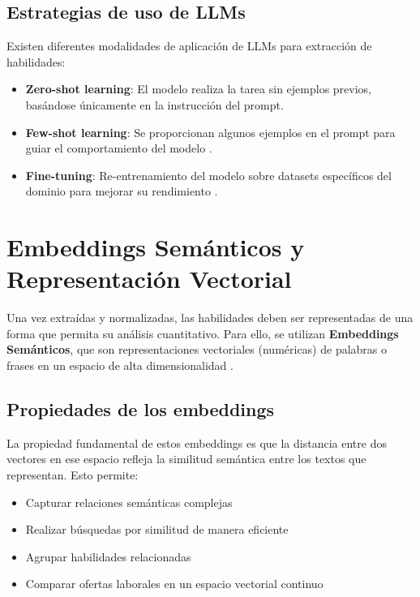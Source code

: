 \subsection{Estrategias de uso de LLMs}

Existen diferentes modalidades de aplicación de LLMs para extracción de habilidades:

\begin{itemize}
    \item \textbf{Zero-shot learning}: El modelo realiza la tarea sin ejemplos previos, basándose únicamente en la instrucción del prompt.
    \item \textbf{Few-shot learning}: Se proporcionan algunos ejemplos en el prompt para guiar el comportamiento del modelo \parencite{nguyen2024}.
    \item \textbf{Fine-tuning}: Re-entrenamiento del modelo sobre datasets específicos del dominio para mejorar su rendimiento \parencite{herandi2024, zhang2022}.
\end{itemize}

\section{Embeddings Semánticos y Representación Vectorial}

Una vez extraídas y normalizadas, las habilidades deben ser representadas de una forma que permita su análisis cuantitativo. Para ello, se utilizan \textbf{Embeddings Semánticos}, que son representaciones vectoriales (numéricas) de palabras o frases en un espacio de alta dimensionalidad \parencite{kavas2024}.

\subsection{Propiedades de los embeddings}

La propiedad fundamental de estos embeddings es que la distancia entre dos vectores en ese espacio refleja la similitud semántica entre los textos que representan. Esto permite:

\begin{itemize}
    \item Capturar relaciones semánticas complejas
    \item Realizar búsquedas por similitud de manera eficiente
    \item Agrupar habilidades relacionadas
    \item Comparar ofertas laborales en un espacio vectorial continuo
\end{itemize}

